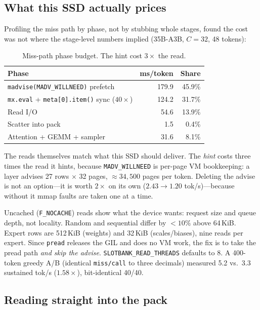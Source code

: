 \subsection{What this SSD actually prices}

Profiling the miss path by phase, not by stubbing whole stages, found the cost was not where the stage-level numbers implied (35B-A3B, $C{=}32$, 48 tokens):

\begin{table}[ht]
\centering
\caption{Miss-path phase budget. The hint cost $3\times$ the read.}
\label{tab:madvise}
\begin{tabular}{@{}lrr@{}}
\toprule
Phase & ms/token & Share \\
\midrule
\texttt{madvise(MADV\_WILLNEED)} prefetch & 179.9 & 45.9\% \\
\texttt{mx.eval} + \texttt{meta[0].item()} sync ($40\times$) & 124.2 & 31.7\% \\
Read I/O & 54.6 & 13.9\% \\
Scatter into pack & 1.5 & 0.4\% \\
Attention + GEMM + sampler & 31.6 & 8.1\% \\
\bottomrule
\end{tabular}
\end{table}

The reads themselves match what this SSD should deliver. The \emph{hint} costs three times the read it hints, because \texttt{MADV\_WILLNEED} is per-page VM bookkeeping: a layer advises 27 rows $\times$ 32 pages, $\approx 34{,}500$ pages per token. Deleting the advise is not an option---it is worth $2\times$ on its own ($2.43\to 1.20$ tok/s)---because without it mmap faults are taken one at a time.

Uncached (\texttt{F\_NOCACHE}) reads show what the device wants: request size and queue depth, not locality. Random and sequential differ by ${<}10\%$ above 64\,KiB. Expert rows are 512\,KiB (weights) and 32\,KiB (scales/biases), nine reads per expert. Since \texttt{pread} releases the GIL and does no VM work, the fix is to take the pread path \emph{and skip the advise}. \texttt{SLOTBANK\_READ\_THREADS} defaults to 8. A 400-token greedy A/B (identical \texttt{miss/call} to three decimals) measured 5.2 vs.\ 3.3 sustained tok/s ($1.58\times$), bit-identical 40/40.

\subsection{Reading straight into the pack}

